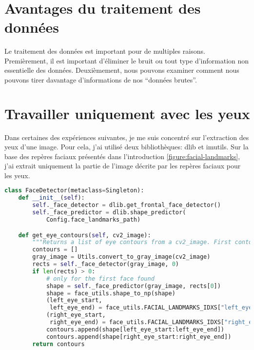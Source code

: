 \section{Avantages du traitement des données}
\paragraph{}
Le traitement des données est important pour de multiples raisons.
Premièrement, il est important d'éliminer le bruit ou tout type d'information non essentielle des données.
Deuxièmement, nous pouvons examiner comment nous pouvons tirer davantage d'informations de nos ``données brutes''.

\section{Travailler uniquement avec les yeux}
\label{data-processing:eyes}
\paragraph{}
Dans certaines des expériences suivantes, je me suis concentré sur l'extraction des yeux d'une image.
Pour cela, j'ai utilisé deux bibliothèques: dlib et imutils.
Sur la base des repères faciaux présentés dans l'introduction \ref{figure:facial-landmarks}, j'ai extrait uniquement la partie de l'image décrite par les repères faciaux pour les yeux.

\begin{lstlisting}[language=Python, caption=Extraire le contour des yeux]
class FaceDetector(metaclass=Singleton):
    def __init__(self):
        self._face_detector = dlib.get_frontal_face_detector()
        self._face_predictor = dlib.shape_predictor(
            Config.face_landmarks_path)

    def get_eye_contours(self, cv2_image):
        """Returns a list of eye contours from a cv2_image. First contour is for the left eye"""
        contours = []
        gray_image = Utils.convert_to_gray_image(cv2_image)
        rects = self._face_detector(gray_image, 0)
        if len(rects) > 0:
            # only for the first face found
            shape = self._face_predictor(gray_image, rects[0])
            shape = face_utils.shape_to_np(shape)
            (left_eye_start,
             left_eye_end) = face_utils.FACIAL_LANDMARKS_IDXS["left_eye"]
            (right_eye_start,
             right_eye_end) = face_utils.FACIAL_LANDMARKS_IDXS["right_eye"]
            contours.append(shape[left_eye_start:left_eye_end])
            contours.append(shape[right_eye_start:right_eye_end])
        return contours
\end{lstlisting}

